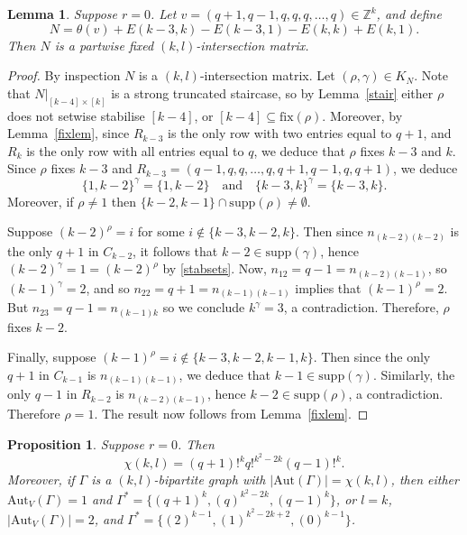 \documentclass{daj}
\newcommand\Aut{\mathrm{Aut}}
\newcommand\fix{\mathrm{fix}}
\newcommand\supp{\mathrm{supp}}
\newcommand\Z{\mathbb{Z}}
\theoremstyle{plain}
\newtheorem{lemma}[theorem]{Lemma}
\newtheorem{proposition}[theorem]{Proposition}
\theoremstyle{definition}
\begin{document}
\begin{lemma}\label{bestmat0}
Suppose $r=0$. Let $v=(q+1,q-1,q,q,q,\dots,q)\in \Z^k$, and define $$N=\theta(v)+E(k-3,k)-E(k-3,1)-E(k,k)+E(k,1).$$ Then $N$ is a partwise fixed $(k,l)$-intersection matrix.
\end{lemma}
\begin{proof}


By inspection $N$ is a $(k,l)$-intersection matrix. Let $(\rho,\gamma)\in K_N$. 
Note that $N|_{[k-4]\times [k]}$ is a strong truncated staircase, so by Lemma~\ref{stair} either $\rho$ does not setwise stabilise $[k-4]$, or $[k-4]\subseteq\fix(\rho)$. Moreover, by Lemma~\ref{fixlem}, since $R_{k-3}$ is the only row with two entries equal to $q+1$, and $R_k$ is the only row with all entries equal to $q$, we deduce that $\rho$ fixes $k-3$ and $k$. Since $\rho$ fixes $k-3$ and $R_{k-3}=(q-1,q,q,\dots,q,q+1,q-1,q,q+1)$, we deduce \begin{equation}\label{stabsets}\{1,k-2\}^\gamma=\{1,k-2\}\quad\text{and}\quad\{k-3,k\}^\gamma=\{k-3,k\}.\end{equation} Moreover, if $\rho\ne 1$  then $\{k-2,k-1\}\cap\supp(\rho)\ne\emptyset$.

Suppose $(k-2)^\rho= i$ for some $i\not\in\{k-3,k-2,k\}$. Then since $n_{(k-2)(k-2)}$ is the only $q+1$ in $C_{k-2}$, it follows that $k-2\in\supp(\gamma)$, hence $(k-2)^\gamma=1=(k-2)^\rho$ by \eqref{stabsets}. Now, $n_{12}=q-1=n_{(k-2)(k-1)}$, so $(k-1)^\gamma= 2$, and so $n_{22}=q+1=n_{(k-1)(k-1)}$ implies that $(k-1)^\rho= 2$. But $n_{23}=q-1=n_{(k-1)k}$ so we conclude $k^\gamma= 3$, a contradiction. Therefore, $\rho$ fixes $k-2$.

Finally, suppose $(k-1)^\rho=i\not\in \{k-3,k-2,k-1,k\}$. Then since the only $q+1$ in $C_{k-1}$ is $n_{(k-1)(k-1)}$, we deduce that $k-1\in\supp(\gamma)$. Similarly, the only $q-1$ in $R_{k-2}$ is $n_{(k-2)(k-1)}$, hence $k-2\in\supp(\rho)$, a contradiction. Therefore $\rho=1$. The result now follows from Lemma~\ref{fixlem}.
\end{proof}
\begin{proposition}\label{0}
Suppose $r=0$. Then $$\chi(k,l)=(q+1)!^kq!^{k^2-2k}(q-1)!^k.$$ Moreover, if $\Gamma$ is a $(k,l)$-bipartite graph with $|\Aut(\Gamma)|=\chi(k,l)$, then either $\Aut_V(\Gamma)=1$ and $\Gamma^*=\{(q+1)^k,(q)^{k^2-2k},(q-1)^k\}$, or $l=k$, $|\Aut_V(\Gamma)|=2$, and $\Gamma^*=\{(2)^{k-1},(1)^{k^2-2k+2},(0)^{k-1}\}$.
\end{proposition}
\end{document}
